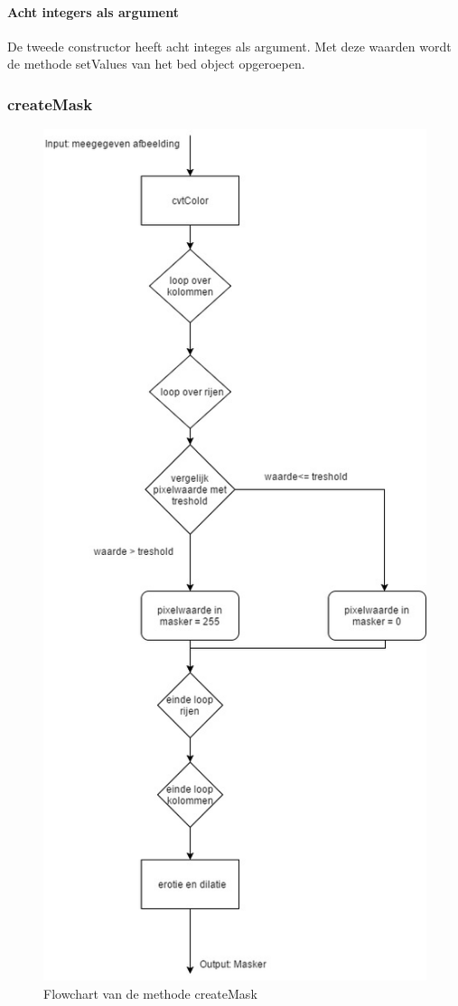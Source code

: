 \paragraph{Acht integers als argument}
De tweede constructor heeft acht integes als argument. Met deze waarden wordt de methode setValues van het bed object opgeroepen.

\subsubsection{createMask}
\begin{figure}[hbp]
	\includegraphics[scale=0.45]{FlowShart_createMask}
	\caption{Flowchart van de methode createMask}
	\label{imgFSCMa}
\end{figure}

